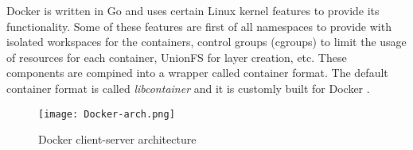 \documentclass{article}
\begin{document}
Docker is written in Go and uses certain Linux kernel features to provide its functionality. Some of these features are first of all namespaces to provide with isolated workspaces for the containers, control groups (cgroups) to limit the usage of resources for each container, UnionFS for layer creation, etc. These components are compined into a wrapper called container format. The default container format is called \textit{libcontainer} and it is customly built for Docker \cite{docker-underlying}.\\[0.5cm]

\begin{center}
    \begin{figure}[h!]
    \centering
    \texttt{[image: Docker-arch.png]}
    \caption{Docker client-server architecture}
    \end{figure}
\end{center}
\end{document}
